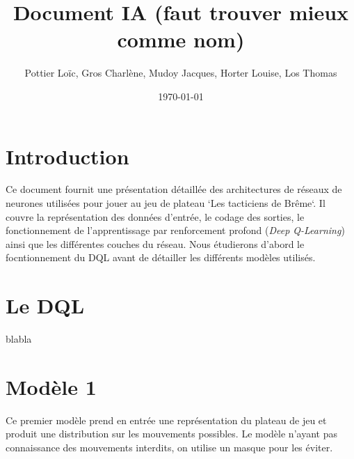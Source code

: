 \documentclass[]{article}
\title{\textbf{Document IA (faut trouver mieux comme nom)}} %
\author{Pottier Loïc, Gros Charlène, Mudoy Jacques, Horter Louise, Los Thomas}
\date{\today}
\begin{document}
\maketitle

\section{Introduction}
Ce document fournit une présentation détaillée des architectures de réseaux de neurones utilisées pour jouer au jeu de plateau `Les tacticiens de Brême`. Il couvre la représentation des données d'entrée, le codage des sorties, le fonctionnement de l'apprentissage par renforcement profond (\textit{Deep Q-Learning}) ainsi que les différentes couches du réseau.
Nous étudierons d'abord le focntionnement du DQL avant de détailler les différents modèles utilisés.

\section{Le DQL}
blabla

\section{Modèle 1} %
Ce premier modèle prend en entrée une représentation du plateau de jeu et produit une distribution sur les mouvements possibles.
Le modèle n'ayant pas connaissance des mouvements interdits, on utilise un masque pour les éviter.
\end{document}
